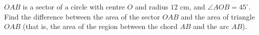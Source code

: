 $OAB$ is a sector of a circle with centre $O$ and radius $12$ cm, and $\angle AOB=45^\circ$. Find the difference between the area of the sector $OAB$ and the area of triangle $OAB$ (that is, the area of the region between the chord $AB$ and the arc $AB$).
